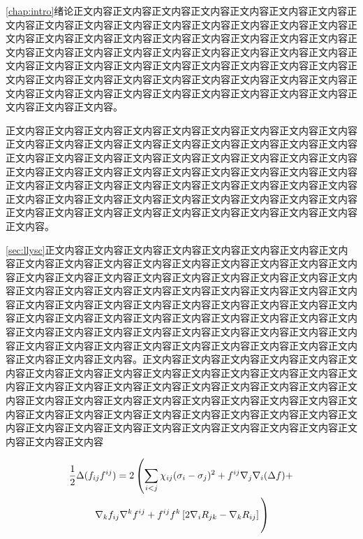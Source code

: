 \label{chap:intro}
\cref{chap:intro}绪论正文内容\cite{同鸣2012}正文内容正文内容正文内容正文内容正文内容正文内容正文内容正文内容正文内容正文内容正文内容正文内容正文内容正文内容正文内容正文内容正文内容正文内容正文内容正文内容正文内容正文内容正文内容正文内容正文内容正文内容正文内容正文内容正文内容正文内容正文内容正文内容正文内容正文内容正文内容正文内容正文内容正文内容正文内容正文内容正文内容正文内容正文内容正文内容正文内容正文内容正文内容正文内容正文内容正文内容正文内容正文内容正文内容正文内容正文内容正文内容正文内容正文内容正文内容正文内容正文内容正文内容正文内容。

正文内容正文内容正文内容正文内容正文内容正文内容\cite{Boutsidis2011}正文内容正文内容正文内容正文内容正文内容正文内容正文内容正文内容正文内容正文内容正文内容正文内容正文内容正文内容正文内容正文内容正文内容正文内容正文内容正文内容正文内容正文内容正文内容正文内容正文内容正文内容正文内容正文内容正文内容正文内容正文内容正文内容正文内容正文内容正文内容正文内容正文内容正文内容正文内容正文内容正文内容正文内容正文内容正文内容正文内容正文内容正文内容正文内容正文内容正文内容正文内容正文内容正文内容正文内容正文内容正文内容正文内容正文内容。


\label{sec:llysc}
\cref{sec:llysc}\citep{同鸣2012}正文内容正文内容\citet{同鸣2012}正文内容正文内容正文内容正文内容\cite{同鸣2012, Lee1999, Tang2013, Ding2006Orthogonal}正文内容正文内容正文内容正文内容正文内容正文内容正文内容正文内容正文内容正文内容正文内容正文内容正文内容正文内容正文内容正文内容正文内容正文内容正文内容正文内容正文内容正文内容正文内容正文内容正文内容正文内容正文内容正文内容正文内容正文内容正文内容正文内容正文内容正文内容正文内容正文内容正文内容正文内容正文内容正文内容正文内容正文内容正文内容正文内容正文内容正文内容正文内容正文内容正文内容正文内容正文内容正文内容正文内容正文内容正文内容正文内容正文内容正文内容正文内容正文内容正文内容正文内容正文内容正文内容正文内容正文内容正文内容正文内容。正文内容正文内容正文内容正文内容正文内容正文内容正文内容正文内容正文内容正文内容正文内容正文内容正文内容正文内容正文内容正文内容正文内容正文内容正文内容正文内容正文内容正文内容正文内容正文内容正文内容正文内容正文内容正文内容正文内容正文内容正文内容正文内容正文内容正文内容正文内容正文内容正文内容正文内容正文内容正文内容正文内容正文内容正文内容正文内容正文内容正文内容正文内容正文内容正文内容正文内容正文内容正文内容正文内容

\begin{multline}
\frac{1}{2}\Delta(f_{ij}f^{ij})=
2\left(\sum_{i<j}\chi_{ij}(\sigma_i-\sigma_j)^2+f^{ij}\nabla_j\nabla_i(\Delta f)+\right .\\
\left .\nabla_kf_{ij}\nabla^kf^{ij}+f^{ij}f^k\left[2\nabla_iR_{jk}-\nabla_kR_{ij}\right]\vphantom{\sum_{i<j}}\right)
\end{multline}

